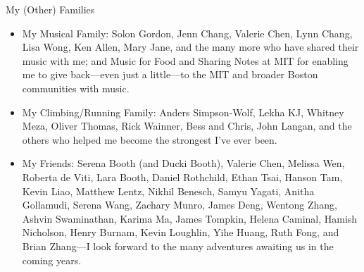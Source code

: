 \begin{center}{My (Other) Families}\end{center} 
    \begin{itemize}
    \item My Musical Family: Solon Gordon, Jenn Chang, Valerie Chen, Lynn Chang, Lisa Wong,
        Ken Allen, Mary Jane, and the many more who have shared their music with
            me; and Music for Food and Sharing Notes at MIT for enabling me to
            give back---even just a little---to the MIT and broader Boston
            communities with music.    

    \item My Climbing/Running Family: Anders Simpson-Wolf, Lekha KJ, Whitney Meza, Oliver Thomas, Rick
        Wainner, Bess and Chris, John Langan, and the others who helped
        me become the strongest I've ever been.

    \item My Friends: Serena Booth (and Ducki Booth), Valerie Chen, Melissa Wen, Roberta
        de Viti, Lara Booth, Daniel Rothchild, Ethan Tsai, Hanson Tam, Kevin
            Liao, Matthew Lentz, Nikhil Benesch, Samyu Yagati, Anitha
            Gollamudi, Serena Wang, Zachary Munro, James Deng, Wentong Zhang,
            Ashvin Swaminathan, Karima Ma, James Tompkin, Helena Caminal, Hamish Nicholson,
            Henry Burnam, Kevin Loughlin, Yihe Huang, Ruth Fong, and Brian Zhang---I look forward
            to the many adventures awaiting us in the coming years.
    \end{itemize}

 
